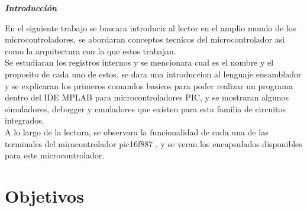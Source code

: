 \documentclass[12pt,a4paper]{article}
\begin{document}
\begin{titlepage}
\end{titlepage} 

   \newpage
   
   
   \begin{center}
    \textbf{\textit{Introducción}}
   \end{center}
   En el siguiente trabajo se buscara introducir al lector en el amplio mundo de los microcontroladores, se abordaran conceptos tecnicos del microcontrolador asi como la arquitectura con la que estos trabajan.\\
   Se estudiaran los registros internos y se mencionara cual es el nombre y el proposito de cada uno de estos, se dara una introduccion al lenguaje ensamblador y se explicaran los primeros comandos basicos para poder realizar un programa dentro del IDE MPLAB para microcontroladores PIC, y se mostraran algunos simuladores, debugger y emuladores que existen para esta familia de circuitos integrados.\\
   A lo largo de la lectura, se observara la funcionalidad de cada una de las terminales del mirocontrolador pic16f887 , y se veran los encapsulados disponibles para este microcontrolador.
   
   \newpage
   \tableofcontents
   \newpage
   \listoffigures
   \newpage
   \listoftables
   \newpage
   \renewcommand{\figurename}{Figura 1.}
    \renewcommand{\tablename}{Tabla 1.}
   \setcounter{table}{0}
   \section{Objetivos}
 
\end{document}

